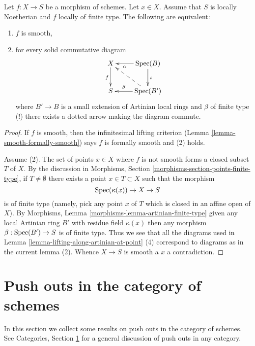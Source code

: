 \begin{lemma}
\label{lemma-lifting-along-artinian}
Let $f : X \to S$ be a morphism of schemes.
Let $x \in X$.
Assume that $S$ is locally Noetherian and $f$ locally of finite type.
The following are equivalent:
\begin{enumerate}
\item $f$ is smooth,
\item for every solid commutative diagram
$$
\xymatrix{
X \ar[d]_f & \Spec(B) \ar[d]^i \ar[l]^-\alpha \\
S & \Spec(B') \ar[l]_-{\beta} \ar@{-->}[lu]
}
$$
where $B' \to B$ is a small extension of Artinian local rings
and $\beta$ of finite type (!) there exists a dotted arrow making
the diagram commute.
\end{enumerate}
\end{lemma}

\begin{proof}
If $f$ is smooth, then the infinitesimal lifting criterion
(Lemma \ref{lemma-smooth-formally-smooth}) says
$f$ is formally smooth and (2) holds.

\medskip\noindent
Assume (2). The set of points $x \in X$ where $f$ is not smooth
forms a closed subset $T$ of $X$. By the discussion in Morphisms,
Section \ref{morphisms-section-points-finite-type}, if $T \not = \emptyset$
there exists a point $x \in T \subset X$ such that the morphism
$$
\mathop{\rm Spec}(\kappa(x)) \to X \to S
$$
is of finite type (namely, pick any point $x$ of $T$ which is closed
in an affine open of $X$). By
Morphisms, Lemma \ref{morphisms-lemma-artinian-finite-type} given any
local Artinian ring $B'$ with residue field $\kappa(x)$ then any
morphism $\beta : \mathop{\rm Spec}(B') \to S$ is of finite type. Thus
we see that all the diagrams used in
Lemma \ref{lemma-lifting-along-artinian-at-point} (4) correspond
to diagrams as in the current lemma (2). Whence $X \to S$ is smooth
a $x$ a contradiction.
\end{proof}






\section{Push outs in the category of schemes}
\label{section-pushouts}

\noindent
In this section we collect some results on push outs in the
category of schemes. See Categories, Section \ref{section-pushouts} for a
general discussion of push outs in any category.

